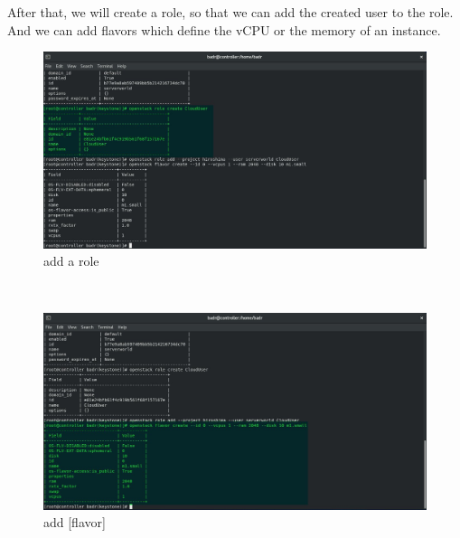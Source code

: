 \begin{spacing}{1.2}
\par After that, we will create a role, so that we can add the created user to the role. And
we can add flavors which define the vCPU or the memory of an instance.
\\
\begin{figure}[!htb] 
\begin{center} 
\includegraphics[width=1\linewidth]{Cloud/Adding Openstack Users/add a role} 
\end{center} 
\caption{add a role} 
\end{figure} 
\FloatBarrier
\\
\begin{figure}[!htb] 
\begin{center} 
\includegraphics[width=1\linewidth]{Cloud/Adding Openstack Users/add [flavor]} 
\end{center} 
\caption{add [flavor]} 
\end{figure} 
\FloatBarrier
\\


\end{spacing}